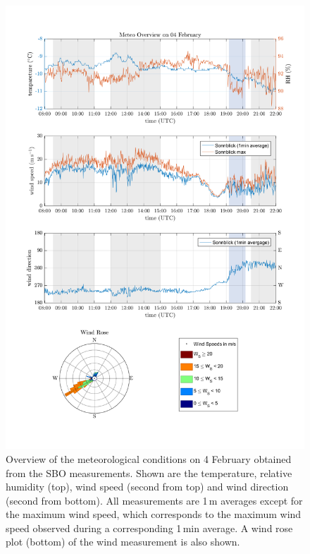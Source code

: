 \documentclass[draft,linenumbers]{agujournal}
\begin{document}
{\begin{figure}[h]
 \centering
 	\includegraphics[width=14cm]{MeteoOvervire_0402.png}
 \caption{Overview of the meteorological conditions on 4 February obtained from the SBO measurements. Shown are the temperature, relative humidity (top), wind speed (second from top) and wind direction (second from bottom). All measurements are 1\,\si{m} averages except for the maximum wind speed, which corresponds to the maximum wind speed observed during a corresponding 1\,\si{min} average. A wind rose plot (bottom) of the wind measurement is also shown.}
 \label{fig:meteo0402}
\end{figure}

}
\end{document}
